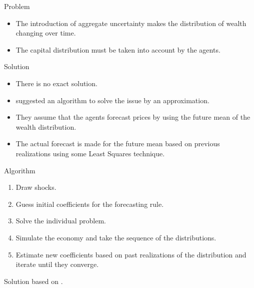 \documentclass{beamer}
\begin{document}
\begin{frame}{Problem}
  \begin{itemize}

  \item {
  The introduction of aggregate uncertainty makes the distribution of wealth changing over time.
  }

  \item {
  The capital distribution must be taken into account by the agents.  
  }

  \end{itemize}
\end{frame}

\begin{frame}{Solution}
  \begin{itemize}

  \item {
  There is no exact solution.
  }

  \item {
  \citeauthor{krussel_smith97} \cite{krussel_smith97} suggested an algorithm to solve the issue by an approximation.  
  }

  \item {
  They assume that the agents forecast prices by using the future mean of the wealth distribution.  
  }

  \item {
  The actual forecast is made for the future mean based on previous realizations using some Least Squares technique.  
  }

  \end{itemize}
\end{frame}

\begin{frame}{Algorithm}
  \begin{enumerate}
    \item {
    Draw shocks.  
    }

    \item {
    Guess initial coefficients for the forecasting rule.  
    }

    \item {
    Solve the individual problem.  
    }

    \item {
    Simulate the economy and take the sequence of the distributions.  
    }

    \item {
    Estimate new coefficients based on past realizations of the distribution and iterate until they converge. 
    }

  

   



  \end{enumerate}
   \pause
    Solution based on \citeauthor{soft} \cite{soft}.
    
\end{frame}
\end{document}
